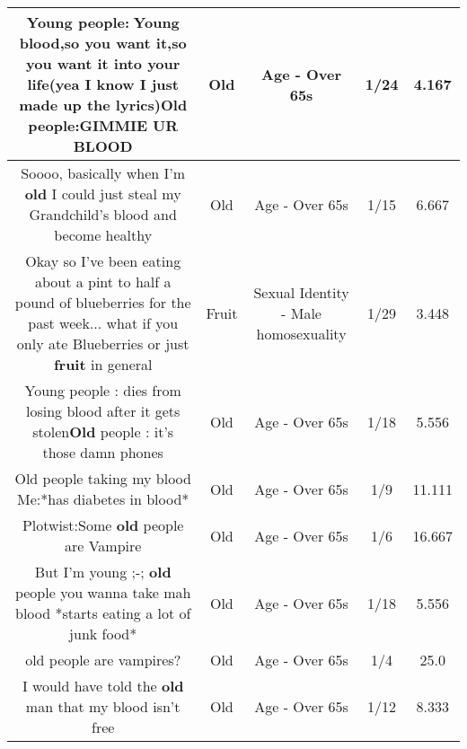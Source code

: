 \documentclass[11pt]{article}
\newlength\mylength
\begin{document}
\begin{center}
\begin{longtable}{|C{.65\mylength}|C{.30\mylength}|C{.12\mylength}|C{.12\mylength}|C{.12\mylength}|}
  \small Young people:🎵Young blood,so you want it,so you want it into your life(yea I know I just made up the lyrics)\textbf{Old} people:GIMMIE UR BLOOD\normalsize   & Old & Age - Over 65s & 1/24 & 4.167 \\  \hline
  \small Soooo, basically when I'm \textbf{old} I could just steal my Grandchild's blood and become healthy\normalsize   & Old & Age - Over 65s & 1/15 & 6.667 \\  \hline
  \small Okay so I've been eating about a pint to half a pound of blueberries for the past week... what if you only ate Blueberries or just \textbf{fruit} in general\normalsize   & Fruit & Sexual Identity - Male homosexuality & 1/29 & 3.448 \\  \hline
  \small Young people : dies from losing blood after it gets stolen\textbf{Old} people : it's those damn phones\normalsize   & Old & Age - Over 65s & 1/18 & 5.556 \\  \hline
  \small Old people taking my blood Me:*has diabetes in blood*\normalsize   & Old & Age - Over 65s & 1/9 & 11.111 \\  \hline
  \small Plotwist:Some \textbf{old} people are Vampire\normalsize   & Old & Age - Over 65s & 1/6 & 16.667 \\  \hline
  \small But I'm young ;-; \textbf{old} people you wanna take mah blood *starts eating a lot of junk food*\normalsize   & Old & Age - Over 65s & 1/18 & 5.556 \\  \hline
  \small old people are vampires?\normalsize   & Old & Age - Over 65s & 1/4 & 25.0 \\  \hline
  \small I would have told the \textbf{old} man that my blood isn't free\normalsize   & Old & Age - Over 65s & 1/12 & 8.333 \\  \hline

\end{longtable}
\end{center}
\end{document}

